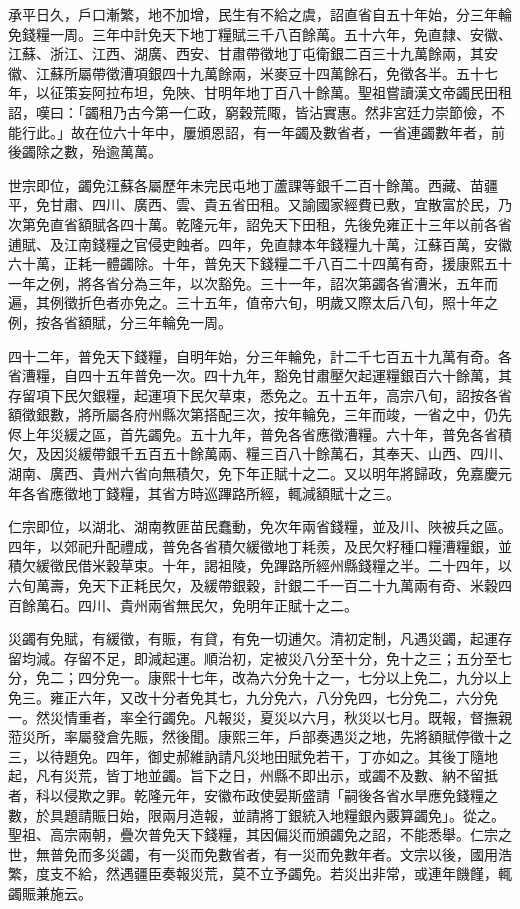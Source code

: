 \begin{pinyinscope}
承平日久，戶口漸繁，地不加增，民生有不給之虞，詔直省自五十年始，分三年輪免錢糧一周。三年中計免天下地丁糧賦三千八百餘萬。五十六年，免直隸、安徽、江蘇、浙江、江西、湖廣、西安、甘肅帶徵地丁屯衛銀二百三十九萬餘兩，其安徽、江蘇所屬帶徵漕項銀四十九萬餘兩，米麥豆十四萬餘石，免徵各半。五十七年，以征策妄阿拉布坦，免陜、甘明年地丁百八十餘萬。聖祖嘗讀漢文帝蠲民田租詔，嘆曰：「蠲租乃古今第一仁政，窮穀荒陬，皆沾實惠。然非宮廷力崇節儉，不能行此。」故在位六十年中，屢頒恩詔，有一年蠲及數省者，一省連蠲數年者，前後蠲除之數，殆逾萬萬。

世宗即位，蠲免江蘇各屬歷年未完民屯地丁蘆課等銀千二百十餘萬。西藏、苗疆平，免甘肅、四川、廣西、雲、貴五省田租。又諭國家經費已敷，宜散富於民，乃次第免直省額賦各四十萬。乾隆元年，詔免天下田租，先後免雍正十三年以前各省逋賦、及江南錢糧之官侵吏蝕者。四年，免直隸本年錢糧九十萬，江蘇百萬，安徽六十萬，正耗一體蠲除。十年，普免天下錢糧二千八百二十四萬有奇，援康熙五十一年之例，將各省分為三年，以次豁免。三十一年，詔次第蠲各省漕米，五年而遍，其例徵折色者亦免之。三十五年，值帝六旬，明歲又際太后八旬，照十年之例，按各省額賦，分三年輪免一周。

四十二年，普免天下錢糧，自明年始，分三年輪免，計二千七百五十九萬有奇。各省漕糧，自四十五年普免一次。四十九年，豁免甘肅壓欠起運糧銀百六十餘萬，其存留項下民欠銀糧，起運項下民欠草束，悉免之。五十五年，高宗八旬，詔按各省額徵銀數，將所屬各府州縣次第搭配三次，按年輪免，三年而竣，一省之中，仍先侭上年災緩之區，首先蠲免。五十九年，普免各省應徵漕糧。六十年，普免各省積欠，及因災緩帶銀千五百五十餘萬兩、糧三百八十餘萬石，其奉天、山西、四川、湖南、廣西、貴州六省向無積欠，免下年正賦十之二。又以明年將歸政，免嘉慶元年各省應徵地丁錢糧，其省方時巡蹕路所經，輒減額賦十之三。

仁宗即位，以湖北、湖南教匪苗民蠢動，免次年兩省錢糧，並及川、陜被兵之區。四年，以郊祀升配禮成，普免各省積欠緩徵地丁耗羨，及民欠籽種口糧漕糧銀，並積欠緩徵民借米穀草束。十年，謁祖陵，免蹕路所經州縣錢糧之半。二十四年，以六旬萬壽，免天下正耗民欠，及緩帶銀穀，計銀二千一百二十九萬兩有奇、米穀四百餘萬石。四川、貴州兩省無民欠，免明年正賦十之二。

災蠲有免賦，有緩徵，有賑，有貸，有免一切逋欠。清初定制，凡遇災蠲，起運存留均減。存留不足，即減起運。順治初，定被災八分至十分，免十之三；五分至七分，免二；四分免一。康熙十七年，改為六分免十之一，七分以上免二，九分以上免三。雍正六年，又改十分者免其七，九分免六，八分免四，七分免二，六分免一。然災情重者，率全行蠲免。凡報災，夏災以六月，秋災以七月。既報，督撫親蒞災所，率屬發倉先賑，然後聞。康熙三年，戶部奏遇災之地，先將額賦停徵十之三，以待題免。四年，御史郝維訥請凡災地田賦免若干，丁亦如之。其後丁隨地起，凡有災荒，皆丁地並蠲。旨下之日，州縣不即出示，或蠲不及數、納不留抵者，科以侵欺之罪。乾隆元年，安徽布政使晏斯盛請「嗣後各省水旱應免錢糧之數，於具題請賑日始，限兩月造報，並請將丁銀統入地糧銀內覈算蠲免」。從之。聖祖、高宗兩朝，疊次普免天下錢糧，其因偏災而頒蠲免之詔，不能悉舉。仁宗之世，無普免而多災蠲，有一災而免數省者，有一災而免數年者。文宗以後，國用浩繁，度支不給，然遇疆臣奏報災荒，莫不立予蠲免。若災出非常，或連年饑饉，輒蠲賑兼施云。


\end{pinyinscope}
